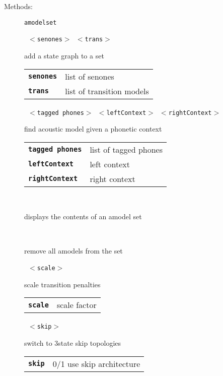 \begin{description}
\vspace{3mm} \item[Methods:] \texttt{amodelset}

    \begin{description}
       \texttt{ $<$senones$>$ $<$trans$>$} \

        add a state graph to a set

      \begin{tabular}{ll}
 \texttt{\textbf{senones}} &  list of senones \\
 \texttt{\textbf{trans}} &    list of transition models \\
      \end{tabular}
       \texttt{ $<$tagged phones$>$ $<$leftContext$>$ $<$rightContext$>$} \

        find acoustic model given a phonetic context

      \begin{tabular}{ll}
 \texttt{\textbf{tagged phones}} &  list of tagged phones \\
 \texttt{\textbf{leftContext}} &    left  context  \\
 \texttt{\textbf{rightContext}} &   right context  \\
      \end{tabular}
       \texttt{} \

        displays the contents of an amodel set

       \texttt{} \

        remove all amodels from the set

       \texttt{ $<$scale$>$} \

        scale transition penalties

      \begin{tabular}{ll}
 \texttt{\textbf{scale}} &  scale factor  \\
      \end{tabular}
       \texttt{ $<$skip$>$} \

        switch to 3state skip topologies

      \begin{tabular}{ll}
 \texttt{\textbf{skip}} &  0/1 use skip architecture  \\
      \end{tabular}
    \end{description}


\end{description}
